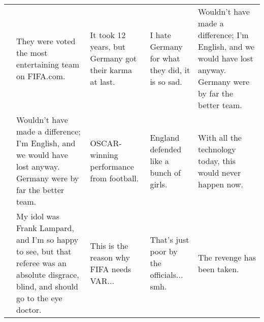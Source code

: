 \documentclass{article}
\begin{document}
\begin{table}[htbp]
\begin{adjustbox}{max width=\linewidth}
\begin{tabular}{|c|p{3.5cm}|p{3.5cm}|p{3.5cm}|p{3.5cm}|}
            & They were voted the most entertaining team on FIFA.com. & It took 12 years, but Germany got their karma at last. & I hate Germany for what they did, it is so sad. & Wouldn't have made a difference; I'm English, and we would have lost anyway. Germany were by far the better team. \\ 
            \cline{2-5}
            & Wouldn't have made a difference; I'm English, and we would have lost anyway. Germany were by far the better team. & OSCAR-winning performance from football. & England defended like a bunch of girls. & With all the technology today, this would never happen now. \\ 
            \cline{2-5}
            & My idol was Frank Lampard, and I'm so happy to see, but that referee was an absolute disgrace, blind, and should go to the eye doctor. & This is the reason why FIFA needs VAR... & That's just poor by the officials... smh. & The revenge has been taken. \\ 
            \hline
        \end{tabular}
    \end{adjustbox}
\end{table}
\end{document}
